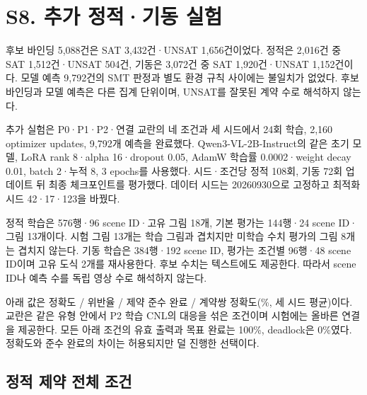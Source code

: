 \documentclass[11pt,a4paper]{article}
\begin{document}
\endgroup
\section*{S8. 추가 정적·기동 실험}

후보 바인딩 5,088건은 SAT 3,432건·UNSAT 1,656건이었다. 정적은 2,016건 중 SAT 1,512건·UNSAT 504건, 기동은 3,072건 중 SAT 1,920건·UNSAT 1,152건이다. 모델 예측 9,792건의 SMT 판정과 별도 환경 규칙 사이에는 불일치가 없었다. 후보 바인딩과 모델 예측은 다른 집계 단위이며, UNSAT를 잘못된 계약 수로 해석하지 않는다.\par

추가 실험은 P0·P1·P2·연결 교란의 네 조건과 세 시드에서 24회 학습, 2,160 optimizer updates, 9,792개 예측을 완료했다. Qwen3-VL-2B-Instruct의 같은 초기 모델, LoRA rank 8·alpha 16·dropout 0.05, AdamW 학습률 0.0002·weight decay 0.01, batch 2·누적 8, 3 epochs를 사용했다. 시드·조건당 정적 108회, 기동 72회 업데이트 뒤 최종 체크포인트를 평가했다. 데이터 시드는 20260930으로 고정하고 최적화 시드 42·17·123을 바꿨다.\par

정적 학습은 576행·96 scene ID·고유 그림 18개, 기본 평가는 144행·24 scene ID·그림 13개이다. 시험 그림 13개는 학습 그림과 겹치지만 미학습 수치 평가의 그림 8개는 겹치지 않는다. 기동 학습은 384행·192 scene ID, 평가는 조건별 96행·48 scene ID이며 고유 도식 2개를 재사용한다. 후보 수치는 텍스트에도 제공한다. 따라서 scene ID나 예측 수를 독립 영상 수로 해석하지 않는다.\par

아래 값은 정확도 / 위반율 / 제약 준수 완료 / 계약쌍 정확도(\%, 세 시드 평균)이다. 교란은 같은 유형 안에서 P2 학습 CNL의 대응을 섞은 조건이며 시험에는 올바른 연결을 제공한다. 모든 아래 조건의 유효 출력과 목표 완료는 100\%, deadlock은 0\%였다. 정확도와 준수 완료의 차이는 허용되지만 덜 진행한 선택이다.\par

\subsection*{정적 제약 전체 조건}
\end{document}
